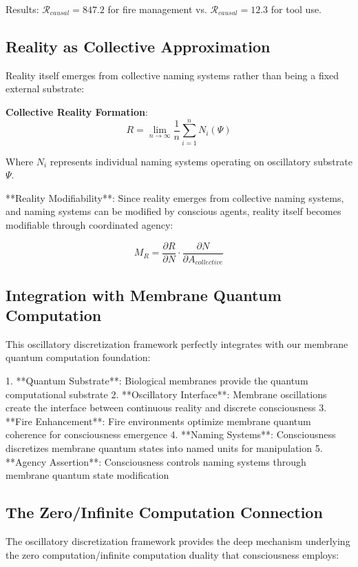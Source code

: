 \documentclass[12pt]{article}
\begin{document}
Results: $\mathcal{R}_{causal} = 847.2$ for fire management vs. $\mathcal{R}_{causal} = 12.3$ for tool use.

\subsection{Reality as Collective Approximation}

Reality itself emerges from collective naming systems rather than being a fixed external substrate:

\textbf{Collective Reality Formation}:
$$R = \lim_{n \to \infty} \frac{1}{n} \sum_{i=1}^{n} N_i(\Psi)$$

Where $N_i$ represents individual naming systems operating on oscillatory substrate $\Psi$.

**Reality Modifiability**: Since reality emerges from collective naming systems, and naming systems can be modified by conscious agents, reality itself becomes modifiable through coordinated agency:

$$M_R = \frac{\partial R}{\partial N} \cdot \frac{\partial N}{\partial A_{collective}}$$

\subsection{Integration with Membrane Quantum Computation}

This oscillatory discretization framework perfectly integrates with our membrane quantum computation foundation:

1. **Quantum Substrate**: Biological membranes provide the quantum computational substrate
2. **Oscillatory Interface**: Membrane oscillations create the interface between continuous reality and discrete consciousness
3. **Fire Enhancement**: Fire environments optimize membrane quantum coherence for consciousness emergence
4. **Naming Systems**: Consciousness discretizes membrane quantum states into named units for manipulation
5. **Agency Assertion**: Consciousness controls naming systems through membrane quantum state modification

\subsection{The Zero/Infinite Computation Connection}

The oscillatory discretization framework provides the deep mechanism underlying the zero computation/infinite computation duality that consciousness employs:
\end{document}
